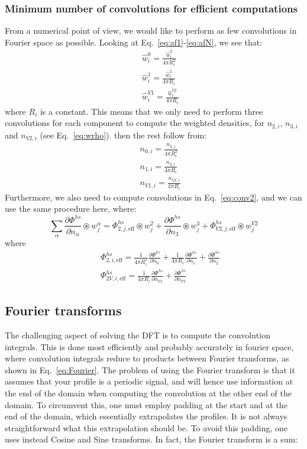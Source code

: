 \documentclass[12pt, letterpaper]{article}
\begin{document}
\subsubsection{Minimum number of convolutions for efficient computations}
From a numerical point of view, we would like to perform as few convolutions in Fourier space as possible. Looking at Eq.~\ref{eq:af1}-\ref{eq:afN}, we see that:
\begin{eqnarray}
  &&\hat{w}_i^0=\frac{\hat{w}_i^2}{4\pi R_i^2} \\
  &&\hat{w}_i^1=\frac{\hat{w}_i^2}{4\pi R_i} \\
  &&\hat{w}_i^{V1}=\frac{\hat{w}_i^{V2}}{4\pi R_i} 
\end{eqnarray}
where $R_i$ is a constant. This means that we only need to perform three convolutions for each component to compute the weighted densities, for $n_{2,i}$, $n_{3,i}$ and $n_{V2,i}$ (see Eq.~\ref{eq:wrho}). then the rest follow from:
\begin{eqnarray}
  &&n_{0,i}=\frac{n_{2,i}}{4\pi R_i^2} \\
  &&n_{1,i}=\frac{n_{2,i}}{4\pi R_i} \\
  &&n_{V1,i}=\frac{n_{V2,i}}{4\pi R_i} 
\end{eqnarray}
Furthermore, we also need to compute convolutions in Eq.~\ref{eq:conv2}, and we can use the same procedure here, where:
\begin{equation}
  \sum_\alpha\frac{\partial \Phi^{hs}}{\partial n_\alpha} \circledast w_j^\alpha= \Phi_{2,j,\text{eff}}^{hs} \circledast w_j^2+
\frac{\partial \Phi^{hs}}{\partial n_{3}} \circledast w_j^3+
  \Phi_{V2,j,\text{eff}}^{hs} \circledast w_j^{V2}
\end{equation}
where
\begin{eqnarray}
&&\Phi_{2,i,\text{eff}}^{hs}=\frac{1}{4\pi R_i^2}\frac{\partial \Phi^{hs}}{\partial n_0}+\frac{1}{4\pi R_i}\frac{\partial \Phi^{hs}}{\partial n_1}+\frac{\partial \Phi^{hs}}{\partial n_2} \\
&&\Phi_{2V,i,\text{eff}}^{hs}=\frac{1}{4\pi R_i}\frac{\partial \Phi^{hs}}{\partial n_{V1}}+\frac{\partial \Phi^{hs}}{\partial n_{V2}}
\end{eqnarray}

\subsection{Fourier transforms}
The challenging aspect of solving the DFT is to compute the convolution integrals. This is done most efficiently and probably accurately in fourier space, where convolution integrals reduce to products between Fourier transforms, as shown in Eq.~\ref{eq:Fourier}. The problem of using the Fourier transform is that it assumes that your profile is a periodic signal, and will hence use information at the end of the domain when computing the convolution at the other end of the domain. To circumvent this, one must employ padding at the start and at the end of the domain, which essentially extrapolates the profiles. It is not always straightforward what this extrapolation should be. To avoid this padding, one uses instead Cosine and Sine transforms. In fact, the Fourier transform is a sum:
\end{document}
